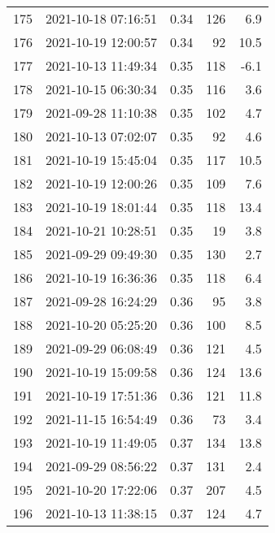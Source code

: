 \begin{tabular}{llrrr}
175 & 2021-10-18 07:16:51 &  0.34 &             126 &                    6.9 \\
176 & 2021-10-19 12:00:57 &  0.34 &              92 &                   10.5 \\
177 & 2021-10-13 11:49:34 &  0.35 &             118 &                   -6.1 \\
178 & 2021-10-15 06:30:34 &  0.35 &             116 &                    3.6 \\
179 & 2021-09-28 11:10:38 &  0.35 &             102 &                    4.7 \\
180 & 2021-10-13 07:02:07 &  0.35 &              92 &                    4.6 \\
181 & 2021-10-19 15:45:04 &  0.35 &             117 &                   10.5 \\
182 & 2021-10-19 12:00:26 &  0.35 &             109 &                    7.6 \\
183 & 2021-10-19 18:01:44 &  0.35 &             118 &                   13.4 \\
184 & 2021-10-21 10:28:51 &  0.35 &              19 &                    3.8 \\
185 & 2021-09-29 09:49:30 &  0.35 &             130 &                    2.7 \\
186 & 2021-10-19 16:36:36 &  0.35 &             118 &                    6.4 \\
187 & 2021-09-28 16:24:29 &  0.36 &              95 &                    3.8 \\
188 & 2021-10-20 05:25:20 &  0.36 &             100 &                    8.5 \\
189 & 2021-09-29 06:08:49 &  0.36 &             121 &                    4.5 \\
190 & 2021-10-19 15:09:58 &  0.36 &             124 &                   13.6 \\
191 & 2021-10-19 17:51:36 &  0.36 &             121 &                   11.8 \\
192 & 2021-11-15 16:54:49 &  0.36 &              73 &                    3.4 \\
193 & 2021-10-19 11:49:05 &  0.37 &             134 &                   13.8 \\
194 & 2021-09-29 08:56:22 &  0.37 &             131 &                    2.4 \\
195 & 2021-10-20 17:22:06 &  0.37 &             207 &                    4.5 \\
196 & 2021-10-13 11:38:15 &  0.37 &             124 &                    4.7 \\

\end{tabular}
